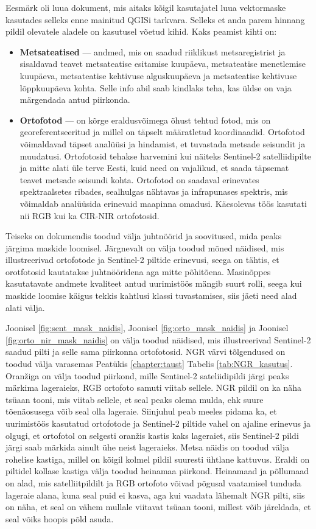 Eesmärk oli luua dokument, mis aitaks kõigil kasutajatel luua vektormaske kasutades selleks enne mainitud QGISi tarkvara. Selleks et anda parem hinnang pildil olevatele aladele on kasutusel võetud kihid. Kaks peamist kihti on:
\begin{itemize}[topsep=1pt,itemsep=1ex,partopsep=1ex,parsep=1ex]
    \item \textbf{Metsateatised} --- andmed, mis on saadud riiklikust metsaregistrist ja sisaldavad teavet metsateatise esitamise kuupäeva, metsateatise menetlemise kuupäeva, metsateatise kehtivuse alguskuupäeva ja metsateatise kehtivuse lõppkuupäeva kohta. Selle info abil saab kindlaks teha, kas üldse on vaja märgendada antud piirkonda.
    \item \textbf{Ortofotod} --- on kõrge eraldusvõimega õhust tehtud fotod, mis on georeferentseeritud ja millel on täpselt määratletud koordinaadid. Ortofotod võimaldavad täpset analüüsi ja hindamist, et tuvastada metsade seisundit ja muudatusi. Ortofotosid tehakse harvemini kui näiteks Sentinel-2 satelliidipilte ja mitte alati üle terve Eesti, kuid need on vajalikud, et saada täpsemat teavet metsade seisundi kohta. Ortofotod on saadaval erinevates spektraalsetes ribades, sealhulgas nähtavas ja infrapunases spektris, mis võimaldab analüüsida erinevaid maapinna omadusi. Käesolevas töös kasutati nii RGB kui ka CIR-NIR ortofotosid. 
\end{itemize}

Teiseks on dokumendis toodud välja juhtnöörid ja soovitused, mida peaks järgima
maskide loomisel. Järgnevalt on välja toodud mõned näidised, mis illustreerivad ortofotode ja Sentinel-2 piltide erinevusi, seega on tähtis, et orotfotosid kautatakse juhtnööridena aga mitte põhitõena. Masinõppes kasutatavate andmete kvaliteet antud uurimistöös mängib suurt rolli, seega kui maskide loomise käigus tekkis kahtlusi klassi tuvastamises, siis jäeti need alad alati välja.

Joonisel \ref{fig:sent_mask_naidis}, Joonisel \ref{fig:orto_mask_naidis} ja Joonisel \ref{fig:orto_nir_mask_naidis} on välja toodud näidised, mis illustreerivad Sentinel-2 saadud pilti ja selle sama piirkonna ortofotosid. NGR värvi tõlgendused on toodud välja varasemas Peatükis \ref{chapter:taust} Tabelis \ref{tab:NGR_kasutus}. Oranžiga on välja toodud piirkond, mille Sentinel-2 sateliidipildi järgi peaks märkima lageraieks, RGB ortofoto samuti viitab sellele. NGR pildil on ka näha tsüaan tooni, mis viitab sellele, et seal peaks olema mulda, ehk suure tõenäosusega võib seal olla lageraie. Siinjuhul peab meeles pidama ka, et uurimistöös kasutatud ortofotode ja Sentinel-2 piltide vahel on ajaline erinevus ja olgugi, et ortofotol on selgesti oranžis kastis kaks lageraiet, siis Sentinel-2 pildi järgi saab märkida ainult ühe neist lageraieks. Metsa näidis on toodud välja rohelise kastiga, millel on kõigil kolmel pildil suuresti ühtlane kattuvus. Eraldi on piltidel kollase kastiga välja toodud heinamaa piirkond. Heinamaad ja põllumaad on alad, mis satelliitpildilt ja RGB ortofoto võivad põgusal vaatamisel tunduda lageraie alana, kuna seal puid ei kasva, aga kui vaadata lähemalt NGR pilti, siis on näha, et seal on vähem mullale viitavat tsüaan tooni, millest võib järeldada, et seal võiks hoopis põld asuda.

